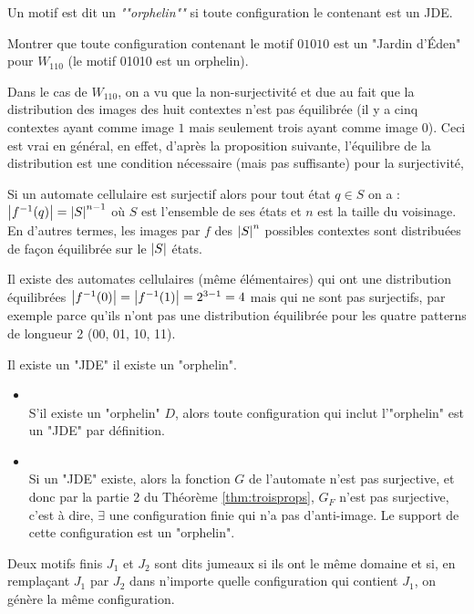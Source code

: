 \begin{definition}
	Un motif est dit un \emph{""orphelin""} si toute configuration le contenant est un JDE.
\end{definition}


\begin{exercice}
	Montrer que toute configuration contenant le motif $01010$ est un "Jardin d'Éden" pour $W_{110}$ (le motif 01010 est un orphelin).
\end{exercice}

Dans le cas de $W_{110}$, on a vu que la non-surjectivité et due au fait que la distribution des images des huit contextes n'est pas équilibrée
(il y a cinq contextes ayant comme image $1$ mais seulement trois ayant comme image $0$). Ceci est vrai en général, en effet, d'après la proposition
suivante,  l'équilibre de la distribution est une condition nécessaire (mais pas suffisante) pour la surjectivité,
\begin{prop}
	Si un automate cellulaire est surjectif alors pour tout état $q \in S$ on a : $\left|f^{-1}(q)\right|=\left|S\right| ^{n-1}$ où $S$ est l'ensemble de ses états et
	$n$ est la taille du voisinage. En d'autres termes, les images par $f$ des $\left|S\right| ^{n}$ possibles contextes sont distribuées de façon équilibrée sur
	le $\left|S\right|$ états.
\end{prop}

Il existe des automates cellulaires (même élémentaires) qui ont une distribution équilibrées $\left|f^{-1}(0)\right|=\left|f^{-1}(1)\right|=2^{3-1}= 4$ mais qui ne
sont pas surjectifs, par exemple parce qu'ils n'ont pas une distribution équilibrée pour les quatre  patterns de longueur 2 (00, 01, 10, 11).


\begin{prop}
	Il existe un "JDE" \ssi il existe un "orphelin".
\end{prop}


\begin{proofI}
	\begin{itemize}
		\item \bimpRL\\
		      S'il existe un "orphelin" $D$, alors toute configuration qui inclut l'"orphelin" est un "JDE" par définition.
		\item \bimpLR\\
		      Si un "JDE" existe, alors la fonction $G$ de l'automate n'est pas surjective, et donc par la partie 2 du Théorème  \ref{thm:troisprops}, $G_F$ n'est pas surjective,
		      c'est à dire, $\exists$ une configuration finie qui n'a pas d'anti-image. Le support de cette configuration est  un "orphelin".
	\end{itemize}
\end{proofI}
\begin{definition}
	Deux motifs finis $J_1$ et $J_2$ sont dits jumeaux si ils ont le même domaine et si, en remplaçant $J_1$ par $J_2$ dans
	n'importe quelle configuration qui contient $J_1$, on génère la même configuration.
\end{definition}

